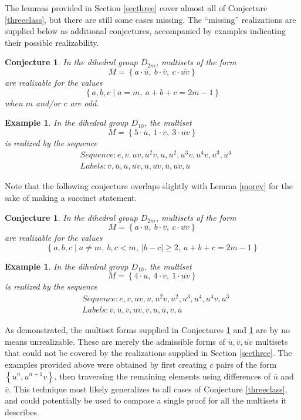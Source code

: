 \documentclass[12pt]{article}
\newtheorem{conj}[thm]{Conjecture}
\newtheorem{exa}[thm]{Example}
\newcommand{\ba}{\[\begin{aligned}}
\newcommand{\ea}{\end{aligned}\]}
\newcommand{\setof}[1]{\left\{#1\right\}}
\newcommand{\setdef}[2]{\left\{#1\mid#2\right\}}
\newcommand{\ol}[1]{\overline{#1}} %
\begin{document}
The lemmas provided in Section \ref{secthree} cover almost all of Conjecture \ref{threeclass},
but there are still some cases missing. The ``missing'' realizations are supplied below
as additional conjectures, accompanied by examples indicating their possible
realizability.

\begin{conj}\label{amodd}
In the dihedral group $D_{2m}$, multisets of the form
$$M = \setof{a \cdot \ol{u},\ b \cdot \ol{v},\ c \cdot \ol{uv}}$$
are realizable for the values
$$\setdef{a, b, c}{a = m,\ a + b + c = 2m - 1}$$
when $m$ and/or $c$ are odd.
\end{conj}

\begin{exa}\label{oddexa}
  In the dihedral group $D_{10}$, the multiset
  $$M = \setof{ 5 \cdot \ol{u},\ 1 \cdot \ol{v},\ 3 \cdot \ol{uv}}$$
  is realized by the sequence
  \ba
  &Sequence : e, v, uv, u^2v, u, u^2, u^3v, u^4v, u^3, u^4\\
  &Labels : \ol{v}, \ol{u}, \ol{u}, \ol{uv}, \ol{u}, \ol{uv}, \ol{u}, \ol{uv}, \ol{u}
  \ea
\end{exa}

Note that the following conjecture overlaps slightly with Lemma \ref{morev} for the
sake of making a succinct statement.

\begin{conj}\label{vuvdiff}
In the dihedral group $D_{2m}$, multisets of the form
$$M = \setof{a \cdot \ol{u},\ b \cdot \ol{v},\ c \cdot \ol{uv}}$$
are realizable for the values
$$\setdef{a, b, c}{a \neq m,\ b,c < m,\ |b - c| \geq 2,\ a + b + c = 2m - 1}$$
\end{conj}
\begin{exa}
  In the dihedral group $D_{10}$, the multiset
  $$M = \setof{ 4 \cdot \ol{u},\ 4 \cdot \ol{v},\ 1 \cdot \ol{uv}}$$
  is realized by the sequence
  \ba
  &Sequence : e, v, uv, u, u^2v, u^2, u^3, u^4, u^4v, u^3\\
  &Labels : \ol{v}, \ol{u}, \ol{v}, \ol{uv}, \ol{v}, \ol{u}, \ol{u}, \ol{v}, \ol{u}
  \ea
\end{exa}

As demonstrated, the multiset forms supplied in Conjectures \ref{amodd} and \ref{vuvdiff}
are by no means unrealizable. These are merely the admissible forms of $\ol{u},\ol{v},\ol{uv}$
multisets that could not be covered by the realizations supplied in Section \ref{secthree}. The
examples provided above were obtained by first creating $c$ pairs of the form $\setof{u^n, u^{n+1}v}$,
then traversing the remaining elements using differences of $\ol{u}$ and $\ol{v}$. This technique most
likely generalizes to all cases of Conjecture \ref{threeclass}, and could potentially be used to compose
a single proof for all the multisets it describes.
\end{document}
